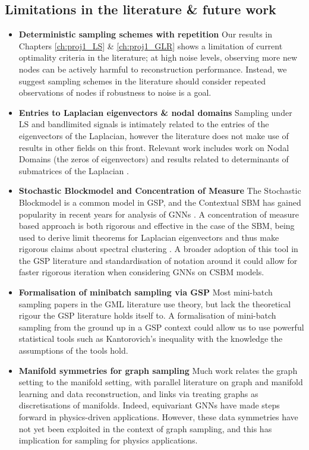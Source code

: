 \subsection{Limitations in the literature \& future work}
\begin{itemize}
\item \textbf{Deterministic sampling schemes with repetition} Our results in Chapters \ref{ch:proj1_LS} \& \ref{ch:proj1_GLR} shows a limitation of current optimality criteria in the literature; at high noise levels, observing more new nodes can be actively harmful to reconstruction performance. Instead, we suggest sampling schemes in the literature should consider repeated observations of nodes if robustness to noise is a goal.
    \item \textbf{Entries to Laplacian eigenvectors \& nodal domains} Sampling under LS and bandlimited signals is intimately related to the entries of the eigenvectors of the Laplacian, however the literature does not make use of results in other fields on this front. Relevant work includes work on Nodal Domains (the zeros of eigenvectors) \cite{biyikougu2007laplacian} and results related to determinants of submatrices of the Laplacian \cite{denton2022eigenvectors}.
    \item \textbf{Stochastic Blockmodel and Concentration of Measure} The Stochastic Blockmodel is a common model in GSP, and the Contextual SBM has gained popularity in recent years for analysis of GNNs \cite{shi2024homophily, zheng2024missing}. A concentration of measure based approach is both rigorous and effective in the case of the SBM, being used to derive limit theorems for Laplacian eigenvectors and thus make rigorous claims about spectral clustering \cite{tang2018limit}. A broader adoption of this tool in the GSP literature and standardisation of notation around it could allow for faster rigorous iteration when considering GNNs on CSBM models.
    \item \textbf{Formalisation of minibatch sampling via GSP} Most mini-batch sampling papers in the GML literature use theory, but lack the theoretical rigour the GSP literature holds itself to. A formalisation of mini-batch sampling from the ground up in a GSP context could allow us to use powerful statistical tools such as Kantorovich's inequality with the knowledge the assumptions of the tools hold.
    \item \textbf{Manifold symmetries for graph sampling} Much work relates the graph setting to the manifold setting, with parallel literature on graph and manifold learning and data reconstruction, and links via treating graphs as discretisations of manifolds. Indeed, equivariant GNNs have made steps forward in physics-driven applications. However, these data symmetries have not yet been exploited in the context of graph sampling, and this has implication for sampling for physics applications.

\end{itemize}
